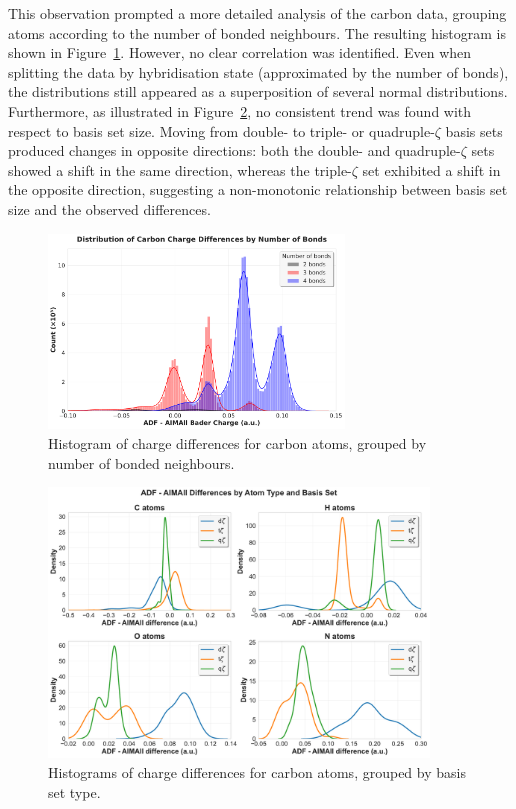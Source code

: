 \newpage
This observation prompted a more detailed analysis of the carbon data, grouping
atoms according to the number of bonded neighbours. The resulting histogram is
shown in Figure~\ref{histo_c_charge}. However, no clear correlation was
identified. Even when splitting the data by hybridisation state (approximated
by the number of bonds), the distributions still appeared as a superposition of
several normal distributions. Furthermore, as illustrated in
Figure~\ref{histo_basis}, no consistent trend was found with respect to basis
set size. Moving from double- to triple- or quadruple-$\zeta$ basis sets
produced changes in opposite directions: both the double- and quadruple-$\zeta$
sets showed a shift in the same direction, whereas the triple-$\zeta$ set
exhibited a shift in the opposite direction, suggesting a non-monotonic
relationship between basis set size and the observed differences.

\begin{figure}[h]
  \centering
  \includegraphics[width=0.7\textwidth]{img/histogram_carbon_bonds.pdf}
  \caption{Histogram of charge differences for carbon atoms, grouped
    by number of bonded neighbours.}
  \label{histo_c_charge}
\end{figure}

\begin{figure}[h]
  \centering
  \includegraphics[width=0.9\textwidth]{img/diff_atom_dtqz}
  \caption{Histograms of charge differences for carbon atoms, grouped
    by basis set type.}
  \label{histo_basis}
\end{figure}

